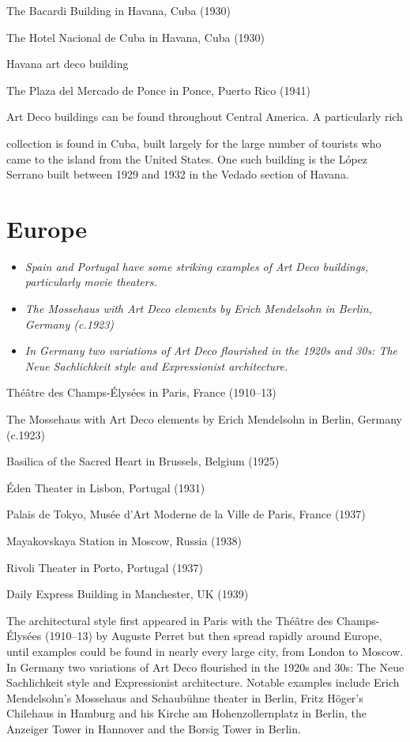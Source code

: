 The Bacardi Building in Havana, Cuba (1930)

The Hotel Nacional de Cuba in Havana, Cuba (1930)

Havana art deco building

The Plaza del Mercado de Ponce in Ponce, Puerto Rico (1941)

Art Deco buildings can be found throughout Central America. A
particularly rich

collection is found in Cuba, built largely for the large number of
tourists who came to the island from the United States. One such
building is the López Serrano built between 1929 and 1932 in the Vedado
section of Havana.

\section{Europe}\label{europe}

\begin{itemize}
\item
  \emph{Spain and Portugal have some striking examples of Art Deco
  buildings, particularly movie theaters.}
\item
  \emph{The Mossehaus with Art Deco elements by Erich Mendelsohn in
  Berlin, Germany (c.1923)}
\item
  \emph{In Germany two variations of Art Deco flourished in the 1920s
  and 30s: The Neue Sachlichkeit style and Expressionist architecture.}
\end{itemize}

Théâtre des Champs-Élysées in Paris, France (1910--13)

The Mossehaus with Art Deco elements by Erich Mendelsohn in Berlin,
Germany (c.1923)

Basilica of the Sacred Heart in Brussels, Belgium (1925)

Éden Theater in Lisbon, Portugal (1931)

Palais de Tokyo, Musée d'Art Moderne de la Ville de Paris, France (1937)

Mayakovskaya Station in Moscow, Russia (1938)

Rivoli Theater in Porto, Portugal (1937)

Daily Express Building in Manchester, UK (1939)

The architectural style first appeared in Paris with the Théâtre des
Champs-Élysées (1910--13) by Auguste Perret but then spread rapidly
around Europe, until examples could be found in nearly every large city,
from London to Moscow. In Germany two variations of Art Deco flourished
in the 1920s and 30s: The Neue Sachlichkeit style and Expressionist
architecture. Notable examples include Erich Mendelsohn's Mossehaus and
Schaubühne theater in Berlin, Fritz Höger's Chilehaus in Hamburg and his
Kirche am Hohenzollernplatz in Berlin, the Anzeiger Tower in Hannover
and the Borsig Tower in Berlin.

